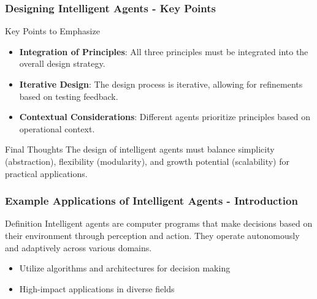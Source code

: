 \documentclass[aspectratio=169]{beamer}
\begin{document}
\begin{frame}[fragile]
    \frametitle{Designing Intelligent Agents - Key Points}
    \begin{block}{Key Points to Emphasize}
        \begin{itemize}
            \item \textbf{Integration of Principles}: All three principles must be integrated into the overall design strategy.
            \item \textbf{Iterative Design}: The design process is iterative, allowing for refinements based on testing feedback.
            \item \textbf{Contextual Considerations}: Different agents prioritize principles based on operational context.
        \end{itemize}
    \end{block}
    
    \begin{block}{Final Thoughts}
        The design of intelligent agents must balance simplicity (abstraction), flexibility (modularity), and growth potential (scalability) for practical applications.
    \end{block}
\end{frame}

\begin{frame}[fragile]
    \frametitle{Example Applications of Intelligent Agents - Introduction}
    \begin{block}{Definition}
        Intelligent agents are computer programs that make decisions based on their environment through perception and action. They operate autonomously and adaptively across various domains.
    \end{block}
    \begin{itemize}
        \item Utilize algorithms and architectures for decision making
        \item High-impact applications in diverse fields
    \end{itemize}
\end{frame}
\end{document}
